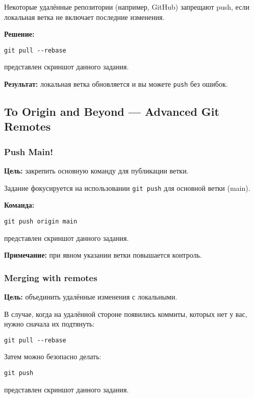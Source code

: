 \documentclass[a4paper,12pt]{report}
\begin{document}
Некоторые удалённые репозитории (например, GitHub) запрещают push, если локальная ветка не включает последние изменения.

\textbf{Решение:}
\begin{verbatim}
git pull --rebase
\end{verbatim}

 представлен скриншот данного задания.

\textbf{Результат:} локальная ветка обновляется и вы можете \texttt{push} без ошибок.

\subsection{To Origin and Beyond — Advanced Git Remotes}

\subsubsection{Push Main!}
\textbf{Цель:} закрепить основную команду для публикации ветки.

Задание фокусируется на использовании \texttt{git push} для основной ветки (main).

\textbf{Команда:}
\begin{verbatim}
git push origin main
\end{verbatim}

 представлен скриншот данного задания.

\textbf{Примечание:} при явном указании ветки повышается контроль.

\subsubsection{Merging with remotes}
\textbf{Цель:} объединить удалённые изменения с локальными.

В случае, когда на удалённой стороне появились коммиты, которых нет у вас, нужно сначала их подтянуть:
\begin{verbatim}
git pull --rebase
\end{verbatim}

Затем можно безопасно делать:
\begin{verbatim}
git push
\end{verbatim}

 представлен скриншот данного задания.
\end{document}
